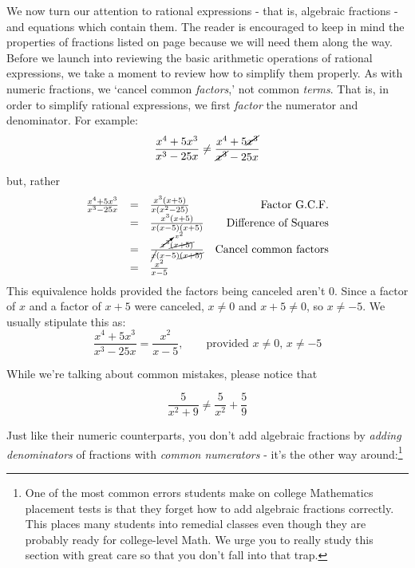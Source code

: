 \documentclass{ximera}
\begin{document}
	\author{Stitz-Zeager}




\setcounter{footnote}{0}

\label{AppRatExpEqus}

We now turn our attention to rational expressions - that is, algebraic fractions - and equations which contain them.  The reader is encouraged to keep in mind the properties of fractions listed on page \pageref{fractionarithmetic} because we will need them along the way.  Before we launch into reviewing the basic arithmetic operations of rational expressions, we take a moment to review how to simplify them properly.  As with numeric fractions, we `cancel common \textit{factors},' not common \textit{terms}.  That is, in order to simplify rational expressions, we first \textit{factor} the numerator and denominator.  For example:  \[ \frac{x^4 + 5x^3}{x^3 - 25x} \neq \frac{x^4 + 5\cancel{x^3}}{\cancel{x^3} - 25x} \]

but, rather \[ \begin{array}{rclr}

\frac{x^4 + 5x^3}{x^3 - 25x} & = & \frac{x^3(x + 5)}{x(x^2-25)} & \text{Factor G.C.F.} \\  
                             & = & \frac{x^3(x + 5)}{x(x-5)(x+5)} & \text{Difference of Squares} \\  
														& = & \frac{\cancelto{x^2}{x^3}\cancel{(x + 5)}}{\cancel{x}(x-5)\cancel{(x+5)}} & \text{Cancel common factors}\\                           
														& = & \frac{x^2}{x-5} & \\ \end{array}\] This equivalence holds provided the factors being canceled aren't $0$. Since a factor of $x$ and a factor of $x+5$ were canceled, $x \neq 0$ and $x+5 \neq 0$, so $x \neq -5$.   We usually stipulate this as: \[ \frac{x^4 + 5x^3}{x^3 - 25x}  = \frac{x^2}{x-5}, \qquad \text{provided $x \neq 0$, $x \neq -5$} \]

While we're talking about common mistakes, please notice that 

\[ \frac{5}{x^2+9} \neq \frac{5}{x^2} + \frac{5}{9} \] 

Just like their numeric counterparts, you don't add algebraic fractions by \textit{adding denominators} of fractions with \textit{common numerators} - it's the other way around:\footnote{One of the most common errors students make on college Mathematics placement tests is that they forget how to add algebraic fractions correctly.  This places many students into remedial classes even though they are probably ready for college-level Math.  We urge you to really study this section with great care so that you don't fall into that trap.} 
\end{document}
